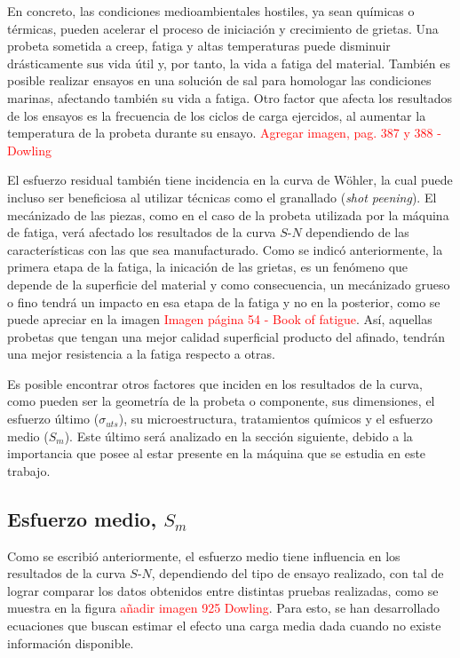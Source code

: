 En concreto, las condiciones medioambientales hostiles, ya sean químicas o térmicas, pueden acelerar el proceso de iniciación y crecimiento de grietas. Una probeta sometida a creep, fatiga y altas temperaturas puede disminuir drásticamente sus vida útil y, por tanto, la vida a fatiga del material. También es posible realizar ensayos en una solución de sal para homologar las condiciones marinas, afectando también su vida a fatiga. Otro factor que afecta los resultados de los ensayos es la frecuencia de los ciclos de carga ejercidos, al aumentar la temperatura de la probeta durante su ensayo. \textcolor{red}{Agregar imagen, pag. 387 y 388 - Dowling}

El esfuerzo residual también tiene incidencia en la curva de Wöhler, la cual puede incluso ser beneficiosa al utilizar técnicas como el granallado (\textit{shot peening}). El mecánizado de las piezas, como en el caso de la probeta utilizada por la máquina de fatiga, verá afectado los resultados de la curva $S$-$N$ dependiendo de las características con las que sea manufacturado. Como se indicó anteriormente, la primera etapa de la fatiga, la inicación de las grietas, es un fenómeno que depende de la superficie del material y como consecuencia, un mecánizado grueso o fino tendrá un impacto en esa etapa de la fatiga y no en la posterior, como se puede apreciar en la imagen \textcolor{red}{Imagen página 54 - Book of fatigue}. Así, aquellas probetas que tengan una mejor calidad superficial producto del afinado, tendrán una mejor resistencia a la fatiga respecto a otras.

Es posible encontrar otros factores que inciden en los resultados de la curva, como pueden ser la geometría de la probeta o componente, sus dimensiones, el esfuerzo último ($\sigma_{uts}$), su microestructura, tratamientos químicos y el esfuerzo medio ($S_m$). Este último será analizado en la sección siguiente, debido a la importancia que posee al estar presente en la máquina que se estudia en este trabajo.

\subsection{Esfuerzo medio, $S_m$}
Como se escribió anteriormente, el esfuerzo medio tiene influencia en los resultados de la curva $S$-$N$, dependiendo del tipo de ensayo realizado, con tal de lograr comparar los datos obtenidos entre distintas pruebas realizadas, como se muestra en la figura \textcolor{red}{añadir imagen 925  Dowling}. Para esto, se han desarrollado ecuaciones que buscan estimar el efecto una carga media dada cuando no existe información disponible.

